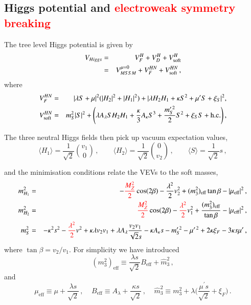 \documentclass[final,3p,times,pdflatex]{elsarticle}
\newcommand{\be}{\begin{equation}}
\newcommand{\ee}{\end{equation}}
\newcommand{\ba}{\begin{eqnarray}}
\newcommand{\ea}{\end{eqnarray}}
\newcommand{\Zv}{{\mbox{$\slashed{Z}_{3}$}\ }} %
\newcommand{\ds}{\displaystyle}
\newcommand{\lamsq}{\lambda^2}
\newcommand*{\red}[1]{\textcolor{red}{#1}}
\begin{document}

\subsection{Higgs potential and \red{electroweak symmetry breaking}\label{sec:hpot}}
The tree level Higgs potential is given by
\ba 
V_{Higgs} & = & V^H_F + V^H_D + V_{\rm soft}^H  \\
& = & V^{\mu=0}_{MSSM} + V^{HN}_{F} + V_{\rm soft}^{HN}\,,
\ea 
where 
\ba 
V^{HN}_{F} & = &  |\lambda S + \mu|^2 (|H_2|^2+|H_1|^2) + |\lambda H_2H_1
+\kappa S^2 + \mu^\prime S + \xi_S|^2  , \label{eq:HpotF} \\
 V_{\rm soft}^{HN}  & = &  m_S^2|S|^2
+ \Bigg(\lambda A_{\lambda}SH_2H_1+\frac{\kappa}{3} A_{\kappa}S^3+ \ds\frac{m_S^{\prime \, 2}}{2} S^2 + \xi_S S + \textrm{h.c.} \Bigg)\,, 
\label{eq:HpotS} \ea

\noindent The three neutral Higgs fields then pick up vacuum expectation values,  
\be 
        \langle H_1 \rangle = \ds\frac{1}{\sqrt{2}}{v_1 \choose 0}\,, 
\qquad  \langle H_2 \rangle = \ds\frac{1}{\sqrt{2}}{0 \choose v_2}\,, 
\qquad  \langle S \rangle =  \ds\frac{1}{\sqrt{2}}s\,, \label{eq:potmin} \ee
  
\noindent and the minimisation conditions relate the VEVs to the soft masses,
\ba m_{H_1}^2&=& -\red{\frac{M_Z^2}{2}} %
 \cos(2\beta) - \ds\frac{\lamsq}{2} v_2^2
 + (m_3^2)_\textrm{eff} \tan\beta 
- |\mu_\textrm{eff}|^2\,, \label{eq:mind}\\
m_{H_2}^2&=& \red{\frac{M_Z^2}{2}} %
 \cos(2\beta) - \ds\red{\frac{\lamsq}{2}} %
 v_1^2 
+  \frac{(m_3^2)_\textrm{eff}}{\tan\beta} 
- |\mu_\textrm{eff}|^2 \,, \label{eq:minu} \\
m_S^2 &=& -\kappa^2 s^2 - \ds\red{\frac{\lamsq}{2}} %
v^2 + \kappa\lambda v_2v_1
+ \lambda A_{\lambda} \frac{v_2v_1}{\sqrt{2}s}
-\kappa A_{\kappa}s  - m^{\prime \,2}_S - \mu^{\prime \,2} + 2 \kappa \xi_F  - 3 \kappa s \mu^\prime \,,\label{eq:mins}
\ea 
where $\tan \beta = v_2 /  v_1$. %
For simplicity we have introduced
\be (m_3^2)_\textrm{eff} \equiv
 \ds\frac{ \lambda s}{\sqrt{2}} B_\textrm{eff} + \widehat{m}_3^2\,, \ee and
\be  \mu_\textrm{eff} \equiv
 \mu + \frac{\lambda s}{\sqrt{2}}\,, \;\;\;\; B_\textrm{eff}\equiv A_\lambda+\ds\frac{\kappa s}{\sqrt{2}}\,, \;\;\;\; \widehat{m}_3^2 \equiv m_3^2 + \lambda \Bigg(\ds\frac{\mu^\prime s}{\sqrt{2}} + \xi_F\Bigg)\,. \ee
\end{document}
